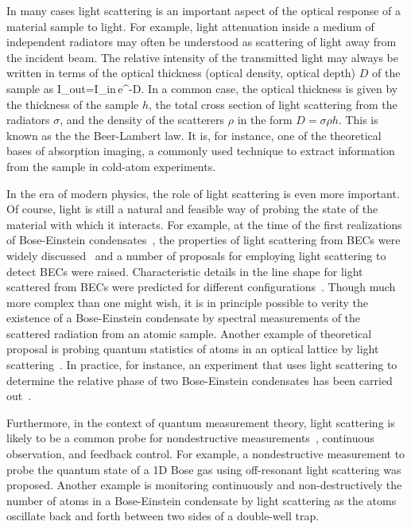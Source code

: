 In many cases light scattering is an important aspect of the optical response of a material sample to light. For example, light attenuation inside a medium of independent radiators may often be understood as scattering of light away from the incident beam. The relative intensity of the transmitted light may always be written in terms of the optical thickness (optical density, optical depth) $D$ of the sample as
\bea
I_{out}=I_{in}\,e^{-D}.
\label{BEER'S_LAW}
\eea
In a common case, the optical thickness is given by the thickness of the sample $h$, the total cross section of light scattering from the radiators $\sigma$, and the density of the scatterers $\rho$ in the form $D=\sigma\rho h$. This is known as the the Beer-Lambert law. It is, for instance, one of the theoretical bases of absorption imaging, a commonly used technique to extract information from the sample in cold-atom experiments. 

In the era of modern physics, the role of light scattering is even more important. Of course, light is still a natural and feasible way of probing the state of the material with which it interacts. For example, at the time of the first realizations of Bose-Einstein condensates~\cite{Anderson14071995,PhysRevLett.75.3969}, the properties of light scattering from BECs were widely discussed~\cite{PhysRevA.43.6444,PhysRevA.51.3896,PhysRevA.52.3033,PhysRevLett.71.1339}  and a number of proposals for employing light scattering to detect BECs were raised. Characteristic details in the line shape for light scattered from BECs were predicted for different configurations~\cite{PhysRevLett.72.2375,PhysRevA.50.R3565,PhysRevLett.75.1927,PhysRevLett.76.1774,PhysRevA.54.R2543}. Though much more complex than one might wish, it is in principle possible to verity the existence of a Bose-Einstein condensate by spectral measurements of the scattered radiation from an atomic sample. Another example of theoretical proposal is probing quantum statistics of atoms in an optical lattice by light scattering~\cite{PhysRevA.76.053618}. In practice, for instance, an experiment that uses light scattering to determine the relative phase of two Bose-Einstein condensates has been carried out~\cite{Saba25032005}.

Furthermore, in the context of quantum measurement theory, light scattering is likely to be a common probe for nondestructive measurements~\cite{RevModPhys.68.1}, continuous observation, and feedback control. For example, a nondestructive measurement to probe the quantum state of a 1D Bose gas using off-resonant light scattering was proposed\cite{PhysRevLett.107.270403}. Another example is monitoring continuously and non-destructively the number of atoms in a Bose-Einstein condensate by light scattering as the atoms oscillate back and forth between two sides of a double-well trap\cite{NJP.JJ}.

